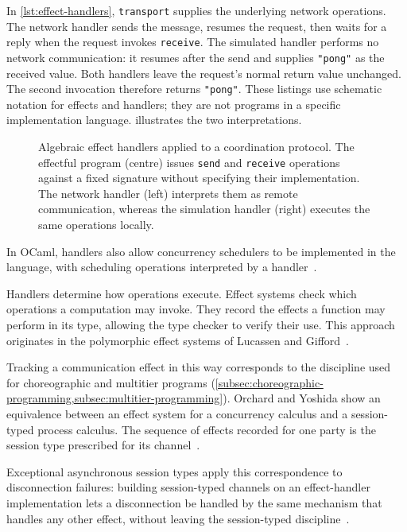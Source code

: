 In \cref{lst:effect-handlers},
\texttt{transport} supplies the underlying network operations.
The network handler sends the message,
resumes the request,
then waits for a reply when the request invokes \texttt{receive}.
The simulated handler performs no network communication:
it resumes after the send and supplies \texttt{"pong"} as the received value.
Both handlers leave the request's normal return value unchanged.
The second invocation therefore returns \texttt{"pong"}.
These listings use schematic notation for effects and handlers;
they are not programs in a specific implementation language.
 illustrates the two interpretations.

\begin{figure}
    \centering
    
    \caption[Effect handlers interpreting a coordination protocol]{Algebraic effect handlers applied to a coordination protocol.
    The effectful program (centre) issues \texttt{send} and \texttt{receive} operations against a fixed signature without specifying their implementation.
    The network handler (left) interprets them as remote communication, whereas the simulation handler (right) executes the same operations locally.}
    \label{fig:effect-handlers}
\end{figure}

In OCaml,
handlers also allow concurrency schedulers to be implemented in the language,
with scheduling operations interpreted by a handler~\cite{DBLP:conf/pldi/Sivaramakrishnan21}.

Handlers determine how operations execute.
Effect systems check which operations a computation may invoke.
They record the effects a function may perform in its type,
allowing the type checker to verify their use.
This approach originates in the polymorphic effect systems of Lucassen and Gifford~\cite{lucassen1988polymorphic}.

Tracking a communication effect in this way corresponds to the discipline used for choreographic and multitier programs (\cref{subsec:choreographic-programming,subsec:multitier-programming}).
Orchard and Yoshida show an equivalence between an effect system for a concurrency calculus and a session-typed process calculus.
The sequence of effects recorded for one party is the session type prescribed for its channel~\cite{DBLP:conf/popl/OrchardY16}.

Exceptional asynchronous session types apply this correspondence to disconnection failures:
building session-typed channels on an effect-handler implementation lets a disconnection be handled by the same mechanism that handles any other effect, without leaving the session-typed discipline~\cite{10.1145/3290341}.

